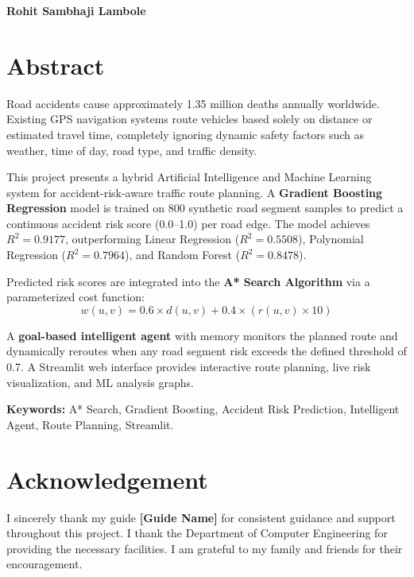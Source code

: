\documentclass[12pt,a4paper]{report}
\begin{document}
\vspace{2cm}
\textbf{Rohit Sambhaji Lambole}
\newpage

\chapter*{Abstract}
Road accidents cause approximately 1.35 million deaths annually worldwide. Existing GPS navigation systems route vehicles based solely on distance or estimated travel time, completely ignoring dynamic safety factors such as weather, time of day, road type, and traffic density.

This project presents a hybrid Artificial Intelligence and Machine Learning system for accident-risk-aware traffic route planning. A \textbf{Gradient Boosting Regression} model is trained on 800 synthetic road segment samples to predict a continuous accident risk score (0.0--1.0) per road edge. The model achieves $R^2 = 0.9177$, outperforming Linear Regression ($R^2 = 0.5508$), Polynomial Regression ($R^2 = 0.7964$), and Random Forest ($R^2 = 0.8478$).

Predicted risk scores are integrated into the \textbf{A* Search Algorithm} via a parameterized cost function:
\[w(u,v) = 0.6 \times d(u,v) + 0.4 \times (r(u,v) \times 10)\]

A \textbf{goal-based intelligent agent} with memory monitors the planned route and dynamically reroutes when any road segment risk exceeds the defined threshold of 0.7. A Streamlit web interface provides interactive route planning, live risk visualization, and ML analysis graphs.

\textbf{Keywords:} A* Search, Gradient Boosting, Accident Risk Prediction, Intelligent Agent, Route Planning, Streamlit.
\newpage

\chapter*{Acknowledgement}
I sincerely thank my guide \textbf{[Guide Name]} for consistent guidance and support throughout this project. I thank the Department of Computer Engineering for providing the necessary facilities. I am grateful to my family and friends for their encouragement.
\newpage

\tableofcontents
\newpage
\listoftables
\newpage
{}
\end{document}

